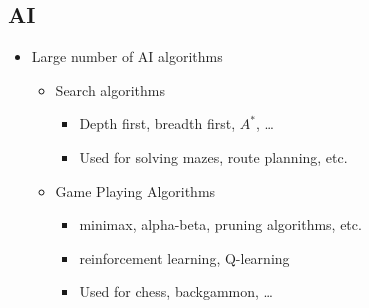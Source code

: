 \Outline %

\begin{slide}
\section{AI}

\begin{PauseHighLight}
  \begin{itemize}
  \item Large number of AI algorithms
    \begin{itemize}
    \item Search algorithms
      \begin{itemize}
      \item Depth first, breadth first, $A^{*}$, \ldots
      \item Used for solving mazes, route planning, etc.
      \end{itemize}
    \item Game Playing Algorithms
      \begin{itemize}
      \item minimax, alpha-beta, pruning algorithms, etc.
      \item reinforcement learning, Q-learning
      \item Used for chess, backgammon, \ldots
      \end{itemize}
    \end{itemize}
  \end{itemize}
\end{PauseHighLight}

\end{slide}



